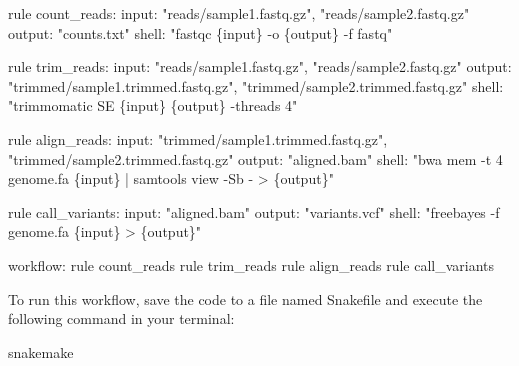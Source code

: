 \documentclass[
]{book}
\newenvironment{Shaded}{\begin{snugshade}}{\end{snugshade}}
\newcommand{\ExtensionTok}[1]{#1}
\newcommand{\NormalTok}[1]{#1}
\newcommand{\StringTok}[1]{\textcolor[rgb]{0.31,0.60,0.02}{#1}}
\begin{document}
\small

\begin{Shaded}
\begin{Highlighting}[]
\ExtensionTok{rule}\NormalTok{ count\_reads:}
    \ExtensionTok{input:}
        \StringTok{"reads/sample1.fastq.gz"}\ExtensionTok{,}
        \StringTok{"reads/sample2.fastq.gz"}
    \ExtensionTok{output:}
        \StringTok{"counts.txt"}
    \ExtensionTok{shell:}
        \StringTok{"fastqc \{input\} {-}o \{output\} {-}f fastq"}

\ExtensionTok{rule}\NormalTok{ trim\_reads:}
    \ExtensionTok{input:}
        \StringTok{"reads/sample1.fastq.gz"}\ExtensionTok{,}
        \StringTok{"reads/sample2.fastq.gz"}
    \ExtensionTok{output:}
        \StringTok{"trimmed/sample1.trimmed.fastq.gz"}\ExtensionTok{,}
        \StringTok{"trimmed/sample2.trimmed.fastq.gz"}
    \ExtensionTok{shell:}
        \StringTok{"trimmomatic SE \{input\} \{output\} {-}threads 4"}

\ExtensionTok{rule}\NormalTok{ align\_reads:}
    \ExtensionTok{input:}
        \StringTok{"trimmed/sample1.trimmed.fastq.gz"}\ExtensionTok{,}
        \StringTok{"trimmed/sample2.trimmed.fastq.gz"}
    \ExtensionTok{output:}
        \StringTok{"aligned.bam"}
    \ExtensionTok{shell:}
        \StringTok{"bwa mem {-}t 4 genome.fa \{input\} | samtools view {-}Sb {-} \textgreater{} \{output\}"}

\ExtensionTok{rule}\NormalTok{ call\_variants:}
    \ExtensionTok{input:}
        \StringTok{"aligned.bam"}
    \ExtensionTok{output:}
        \StringTok{"variants.vcf"}
    \ExtensionTok{shell:}
        \StringTok{"freebayes {-}f genome.fa \{input\} \textgreater{} \{output\}"}

\ExtensionTok{workflow:}
    \ExtensionTok{rule}\NormalTok{ count\_reads}
    \ExtensionTok{rule}\NormalTok{ trim\_reads}
    \ExtensionTok{rule}\NormalTok{ align\_reads}
    \ExtensionTok{rule}\NormalTok{ call\_variants}
\end{Highlighting}
\end{Shaded}

\normalsize

To run this workflow, save the code to a file named Snakefile and execute the following command in your terminal:

\small

\begin{Shaded}
\begin{Highlighting}[]
\ExtensionTok{snakemake}
\end{Highlighting}
\end{Shaded}
\end{document}

